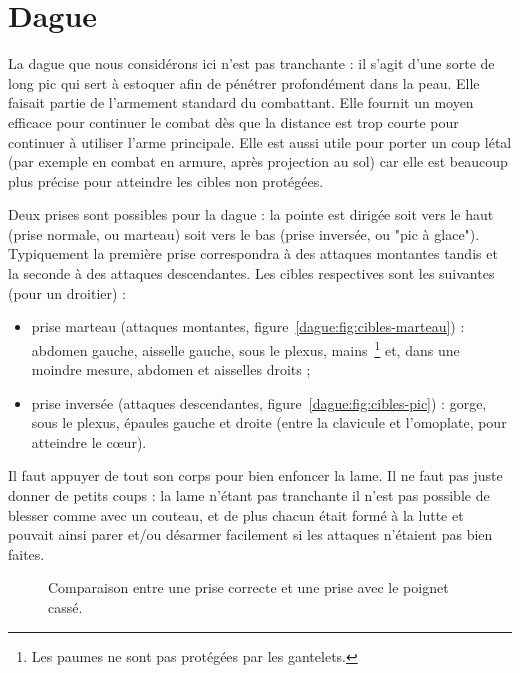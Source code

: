 \chapter{Dague}


La dague que nous considérons ici n'est pas tranchante : il s'agit d'une sorte de long pic qui sert à estoquer afin de pénétrer profondément dans la peau.
Elle faisait partie de l'armement standard du combattant.
Elle fournit un moyen efficace pour continuer le combat dès que la distance est trop courte pour continuer à utiliser l'arme principale.
Elle est aussi utile pour porter un coup létal (par exemple en combat en armure, après projection au sol) car elle est beaucoup plus précise pour atteindre les cibles non protégées.

Deux prises sont possibles pour la dague : la pointe est dirigée soit vers le haut (prise normale, ou marteau) soit vers le bas (prise inversée, ou "pic à glace").
Typiquement la première prise correspondra à des attaques montantes tandis et la seconde à des attaques descendantes.
Les cibles respectives sont les suivantes (pour un droitier) :
\begin{itemize}
	\item prise marteau (attaques montantes, figure~\ref{dague:fig:cibles-marteau}) : abdomen gauche, aisselle gauche, sous le plexus, mains~\footnote{Les paumes ne sont pas protégées par les gantelets.} et, dans une moindre mesure, abdomen et aisselles droits ;
	\item prise inversée (attaques descendantes, figure~\ref{dague:fig:cibles-pic}) : gorge, sous le plexus, épaules gauche et droite (entre la clavicule et l'omoplate, pour atteindre le cœur).
\end{itemize}
Il faut appuyer de tout son corps pour bien enfoncer la lame.
Il ne faut pas juste donner de petits coups : la lame n'étant pas tranchante il n'est pas possible de blesser comme avec un couteau, et de plus chacun était formé à la lutte et pouvait ainsi parer et/ou désarmer facilement si les attaques n'étaient pas bien faites.


\begin{figure}[ht]
	\centering
	\hspace{3cm}
	\caption{Comparaison entre une prise correcte et une prise avec le poignet cassé.}
	\label{dague:fig:cibles}
\end{figure}


